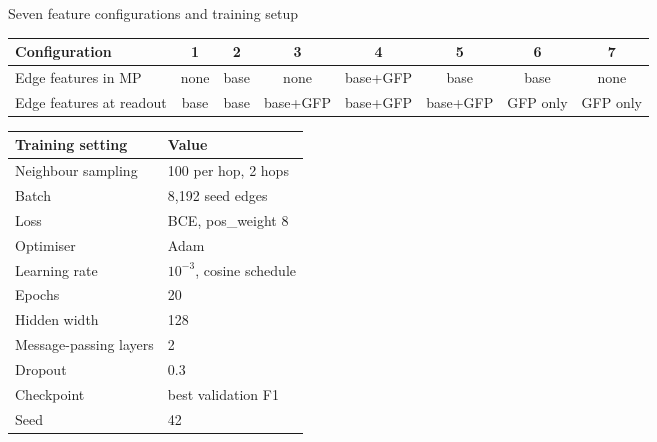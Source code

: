 \documentclass[aspectratio=169,10pt,t]{beamer}
\begin{document}
\begin{frame}{Seven feature configurations and training setup}
  \begin{table}
    \footnotesize
    \setlength{\tabcolsep}{5pt}
    \begin{tabular}{@{}lccccccc@{}}
      \toprule
      Configuration & 1 & 2 & 3 & 4 & 5 & 6 & 7 \\
      \midrule
      Edge features in MP & none & base & none & base+GFP & base & base & none \\
      Edge features at readout & base & base & base+GFP & base+GFP & base+GFP & GFP only & GFP only \\
      \bottomrule
    \end{tabular}
  \end{table}
  \vspace{-0.3em}
  \begin{table}
    \footnotesize
    \setlength{\tabcolsep}{5pt}
    \renewcommand{\arraystretch}{0.92}
    \begin{tabular}{@{}ll@{}}
      \toprule
      Training setting & Value \\
      \midrule
      Neighbour sampling & 100 per hop, 2 hops \\
      Batch & 8{,}192 seed edges \\
      Loss & BCE, pos\_weight 8 \\
      Optimiser & Adam \\
      Learning rate & $10^{-3}$, cosine schedule \\
      Epochs & 20 \\
      Hidden width & 128 \\
      Message-passing layers & 2 \\
      Dropout & 0.3 \\
      Checkpoint & best validation F1 \\
      Seed & 42 \\
      \bottomrule
    \end{tabular}
  \end{table}
\end{frame}
\end{document}
